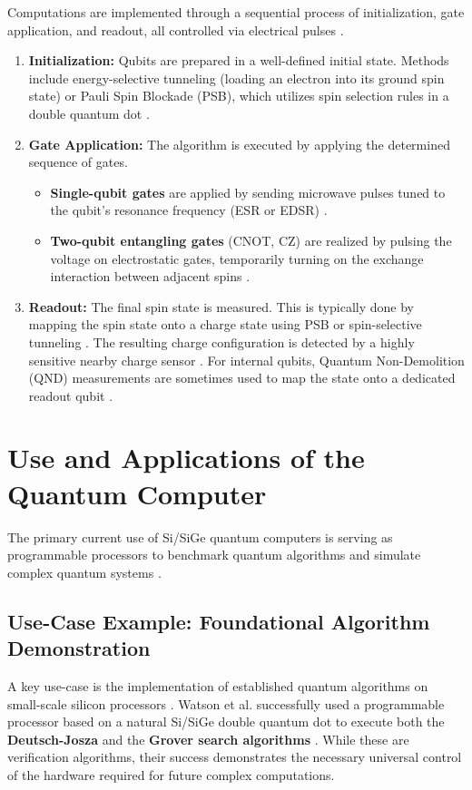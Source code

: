Computations are implemented through a sequential process of initialization, gate application, and readout, all controlled via electrical pulses \cite{ref2, ref9, ref11}.

\begin{enumerate}
    \item \textbf{Initialization:} Qubits are prepared in a well-defined initial state. Methods include energy-selective tunneling (loading an electron into its ground spin state) or Pauli Spin Blockade (PSB), which utilizes spin selection rules in a double quantum dot \cite{ref2, ref9}.
    \item \textbf{Gate Application:} The algorithm is executed by applying the determined sequence of gates.
    \begin{itemize}
        \item \textbf{Single-qubit gates} are applied by sending microwave pulses tuned to the qubit's resonance frequency (ESR or EDSR) \cite{ref1, ref2}.
        \item \textbf{Two-qubit entangling gates} (CNOT, CZ) are realized by pulsing the voltage on electrostatic gates, temporarily turning on the exchange interaction between adjacent spins \cite{ref1, ref2, ref9}.
    \end{itemize}
    \item \textbf{Readout:} The final spin state is measured. This is typically done by mapping the spin state onto a charge state using PSB or spin-selective tunneling \cite{ref2, ref9}. The resulting charge configuration is detected by a highly sensitive nearby charge sensor \cite{ref2, ref9}. For internal qubits, Quantum Non-Demolition (QND) measurements are sometimes used to map the state onto a dedicated readout qubit \cite{ref11}.
\end{enumerate}

\section{Use and Applications of the Quantum Computer}

The primary current use of Si/SiGe quantum computers is serving as programmable processors to benchmark quantum algorithms and simulate complex quantum systems \cite{ref2, ref9}.

\subsection{Use-Case Example: Foundational Algorithm Demonstration}
A key use-case is the implementation of established quantum algorithms on small-scale silicon processors \cite{ref2}. Watson et al. successfully used a programmable processor based on a natural Si/SiGe double quantum dot to execute both the \textbf{Deutsch-Josza} and the \textbf{Grover search algorithms} \cite{ref2}. While these are verification algorithms, their success demonstrates the necessary universal control of the hardware required for future complex computations.

